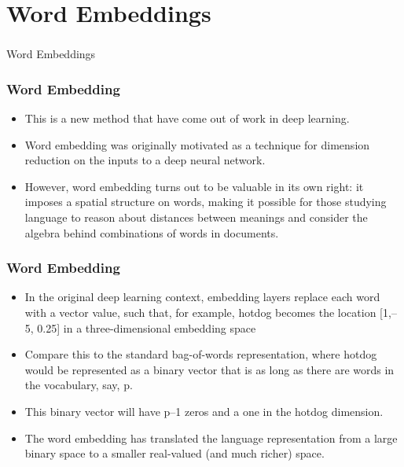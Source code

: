 \documentclass[
  shownotes,
  xcolor={svgnames},
  hyperref={colorlinks,citecolor=DarkBlue,linkcolor=DarkRed,urlcolor=DarkBlue}
  , aspectratio=169]{beamer}
\begin{document}
\section{Word Embeddings}
\begin{frame}[fragile]
\frametitle{}


\centering
{\huge \textcolor{andesred}{Word Embeddings}}


\end{frame}

\begin{frame}
\frametitle{Word Embedding }

\begin{itemize}
\item This is a new method  that have come out of work in deep learning. 
\medskip
\item Word embedding was originally motivated as a technique for dimension reduction on the inputs to a deep neural network. 
\medskip
\medskip
\item However, word embedding turns out to be valuable in its own right: it imposes a spatial structure on words, making it possible for those studying language to reason about distances between meanings and consider the algebra behind combinations of words in documents. 


\end{itemize}




\end{frame}
\begin{frame}
\frametitle{Word Embedding }

\begin{itemize}
  \item In the original deep learning context, embedding layers replace each word with a vector value, such that, for example, hotdog becomes the location [1,–5, 0.25] in a three-dimensional embedding space%
  \item Compare this to the standard bag-of-words representation, where hotdog would be represented as a binary vector that is as long as there are words in the vocabulary, say, p. 
  \medskip
  \item This binary vector will have p–1 zeros and a one in the hotdog dimension. 
  \medskip
  \item The word embedding has translated the language representation from a large binary space to a smaller real-valued (and much richer) space. 
\end{itemize}


\end{frame}
\end{document}
